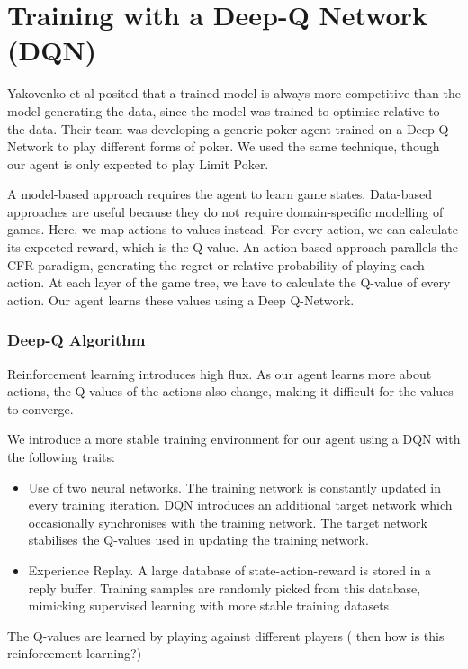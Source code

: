 \documentclass{article}
\begin{document}
\section{Training with a Deep-Q Network (DQN)}

Yakovenko et al posited that a trained model is always more competitive than the model generating the data, since the model was trained to optimise relative to the data. Their team was developing a generic poker agent trained on a Deep-Q Network to play different forms of poker. We used the same technique, though our agent is only expected to play Limit Poker.

A model-based approach requires the agent to learn game states. Data-based approaches are useful because they do not require domain-specific modelling of games. Here, we map actions to values instead. For every action, we can calculate its expected reward, which is the Q-value. An action-based approach parallels the CFR paradigm, generating the regret or relative probability of playing each action. At each layer of the game tree, we have to calculate the Q-value of every action. Our agent learns these values using a Deep Q-Network.

\subsubsection{Deep-Q Algorithm}
Reinforcement learning introduces high flux. As our agent learns more about actions, the Q-values of the actions also change, making it difficult for the values to converge. 

We introduce a more stable training environment for our agent using a DQN with the following traits:

\begin{itemize}
	\item Use of two neural networks. The training network is constantly updated in every training iteration. DQN introduces an additional target network which occasionally synchronises with the training network. The target network stabilises the Q-values used in updating the training network.
	\item Experience Replay. A large database of state-action-reward is stored in a reply buffer. Training samples are randomly picked from this database, mimicking supervised learning with more stable training datasets.
\end{itemize}

The Q-values are learned by playing against different players ( then how is this reinforcement learning?)
\end{document}
